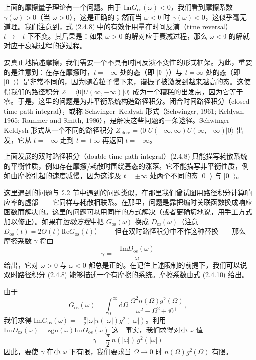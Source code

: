 上面的摩擦量子理论有一个问题。由于 $\mathrm{Im}G_{\mathrm{os}}(\omega) < 0$，我们看到摩擦系数 $\gamma(\omega) > 0$（当 $\omega > 0$），这是正确的；然而当 $\omega < 0$ 时 $\gamma(\omega) < 0$，这似乎毫无道理。我们注意到，式 (2.4.8) 中的有效作用量在时间反演（time reversal）$t \to -t$ 下不变。其后果是：如果 $\omega > 0$ 的解对应于衰减过程，那么 $\omega < 0$ 的解就对应于衰减过程的逆过程。

要真正地描述摩擦，我们需要一个不具有时间反演不变性的形式框架。为此，重要的是注意到：在存在摩擦时，$t = -\infty$ 处的态（即 $|0_-\rangle$）与 $t = \infty$ 处的态（即 $|0_+\rangle$）是非常不同的，因为随着粒子慢下来，谐振子被激发到越来越高的态。这使得我们的路径积分 $Z = \langle 0|U(\infty,-\infty)|0\rangle$ 成为一个糟糕的出发点，因为它等于零。于是，这里的问题是为非平衡系统构造路径积分。闭合时间路径积分（closed-time path integral），或称 Schwinger–Keldysh 形式（Schwinger, 1961; Keldysh, 1965; Rammer and Smith, 1986），是解决这些问题的一条途径。Schwinger–Keldysh 形式从一个不同的路径积分 $Z_{\mathrm{close}} = \langle 0|U(-\infty,\infty)U(\infty,-\infty)|0\rangle$ 出发，它从 $t = -\infty$ 走到 $t = +\infty$ 再返回 $t = -\infty$。

上面发展的双时路径积分（double-time path integral）(2.4.8) 只能描写耗散系统的平衡性质，例如存在摩擦/耗散时围绕基态的涨落。它不能描写非平衡性质，例如由摩擦引起的速度减慢，因为这涉及 $t = \pm\infty$ 处两个不同的态 $|0_-\rangle$ 与 $|0_+\rangle$。

这里遇到的问题与 2.2 节中遇到的问题类似，在那里我们曾试图用路径积分计算响应率的虚部——它同样与耗散相联系。在那里，问题是靠把编时关联函数换成响应函数而解决的。这里的问题可以用同样的方式解决（或者更确切地说，用手工方式加以修正）。如果在\emph{运动方程}中把 $G_{\mathrm{os}}(\omega)$ 换成 $D_{\mathrm{os}}(\omega)$（注意 $D_{\mathrm{os}}(t) = 2\Theta(t)\mathrm{Re}G_{\mathrm{os}}(t)$）——但在双时路径积分中不作这种替换——那么摩擦系数 $\gamma$ 将由
\begin{equation*}
\gamma = -\frac{\mathrm{Im}D_{\mathrm{os}}(\omega)}{\omega} \tag{2.4.10}
\end{equation*}
给出，它对 $\omega > 0$ 与 $\omega < 0$ 都总是正的。在记住上述限制的前提下，我们可以说双时路径积分 (2.4.8) 能够描述一个有摩擦的系统。摩擦系数由式 (2.4.10) 给出。

由于
\begin{equation*}
G_{\mathrm{os}}(\omega) = \int_0^{\infty} \mathrm{d}\Omega\;\frac{\Omega^2 n(\Omega)g^2(\Omega)}{\omega^2 - \Omega^2 + \mathrm{i}0^+},
\end{equation*}
我们求得 $\mathrm{Im}G_{\mathrm{os}}(\omega) = -\frac{\pi}{2}|\omega|n(|\omega|)g^2(|\omega|)$。利用 $\mathrm{Im}D_{\mathrm{os}}(\omega) = \mathrm{sgn}(\omega)\mathrm{Im}G_{\mathrm{os}}(\omega)$ 这一事实，我们求得对小 $\omega$ 值
\begin{equation*}
\gamma = \frac{\pi}{2}\, n(|\omega|)\, g^2(|\omega|) \tag{2.4.11}
\end{equation*}
因此，要使 $\gamma$ 在小 $\omega$ 下有限，我们要求当 $\Omega \to 0$ 时 $n(\Omega)g^2(\Omega)$ 有限。

